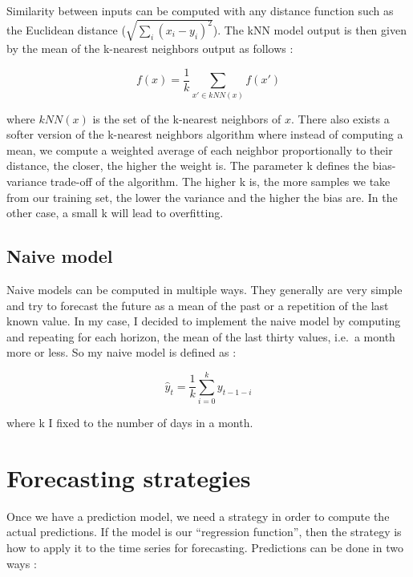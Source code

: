 \documentclass[11pt,a4paper,oneside]{book}
\begin{document}
Similarity between inputs can be computed with any distance function such as the Euclidean distance ($\sqrt{\sum_i \left (  x_i - y_i \right )^{2}}$). The kNN model output is then given by the mean of the k-nearest neighbors output as follows :


\begin{equation}
f\left ( x \right ) = \frac{1}{k}\sum_{x' \in kNN(x) } f\left ( x' \right )
\end{equation}

where $kNN(x)$ is the set of the k-nearest neighbors of $x$. There also exists a softer version of the k-nearest neighbors algorithm where instead of computing a mean, we compute a weighted average of each neighbor proportionally to their distance, the closer, the higher the weight is. The parameter k defines the bias-variance trade-off of the algorithm. The higher k is, the more samples we take from our training set, the lower the variance and the higher the bias are. In the other case, a small k will lead to overfitting. \cite{navot}



\subsection{Naive model}

Naive models can be computed in multiple ways. They generally are very simple and try to forecast the future as a mean of the past or a repetition of the last known value. In my case, I decided to implement the naive model by computing and repeating for each horizon, the mean of the last thirty values, i.e.\ a month more or less. So my naive model is defined as : 

\begin{equation}
\hat{y}_t = \frac{1}{k} \sum_{i=0}^{k} y_{t-1-i}
\end{equation}

where k I fixed to the number of days in a month.


\section{Forecasting strategies}\label{strat}

Once we have a prediction model, we need a strategy in order to compute the actual predictions. If the model is our ``regression function'', then the strategy is how to apply it to the time series for forecasting. Predictions can be done in two ways :
\end{document}
